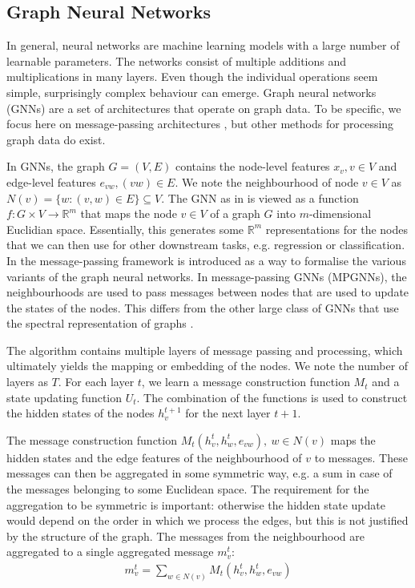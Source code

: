 \documentclass[english, 12pt, a4paper, sci, utf8, a-2b, online]{aaltothesis}
\newcommand{\R}{\mathbb{R}}
\begin{document}
\subsection{Graph Neural Networks}
\label{sec:gnns}

In general, neural networks are machine learning models with a large number of learnable parameters. The networks consist of multiple additions and multiplications in many layers. Even though the individual operations seem simple, surprisingly complex behaviour can emerge. Graph neural networks (GNNs) are a set of architectures that operate on graph data. To be specific, we focus here on message-passing architectures \cite{mpgnn-into-2017}, but other methods for processing graph data do exist.

In GNNs, the graph $G = (V, E)$ contains the node-level features $x_v, v\in V$ and edge-level features $e_{vw}, (vw) \in E$. We note the neighbourhood of node $v \in V$ as $N(v) = \{w : (v, w) \in E\}\subseteq V$. 
The GNN as in \cite{gnn-intro-2009} is viewed as a function $f:G \times V \to \R^m$ that maps the node $v \in V$ of a graph $G$ into $m$-dimensional Euclidian space. Essentially, this generates some $\R^m$ representations for the nodes that we can then use for other downstream tasks, e.g. regression or classification. In \cite{mpgnn-into-2017} the message-passing framework is introduced as a way to formalise the various variants of the graph neural networks.
In message-passing GNNs (MPGNNs), the neighbourhoods are used to pass messages between nodes that are used to update the states of the nodes. This differs from the other large class of GNNs that use the spectral representation of graphs \cite{gnn-review-2020}.

The algorithm contains multiple layers of message passing and processing, which ultimately yields the mapping or embedding of the nodes. We note the number of layers as $T$. For each layer $t$, we learn a message construction function $M_t$ and a state updating function $U_t$. The combination of the functions is used to construct the hidden states of the nodes $h_v^{t+1}$ for the next layer $t+1$.

The message construction function $M_t(h_v^t, h_w^t, e_{vw}),\ w \in N(v)$ maps the hidden states and the edge features of the neighbourhood of $v$ to messages. These messages can then be aggregated in some symmetric way, e.g. a sum in case of the messages belonging to some Euclidean space. The requirement for the aggregation to be symmetric is important: otherwise the hidden state update would depend on the order in which we process the edges, but this is not justified by the structure of the graph. The messages from the neighbourhood are aggregated to a single aggregated message $m_v^t$:
\begin{align}
    m_v^t = \sum_{w \in N(v)}M_t(h_v^t, h_w^t, e_{vw})
\end{align}
\end{document}
